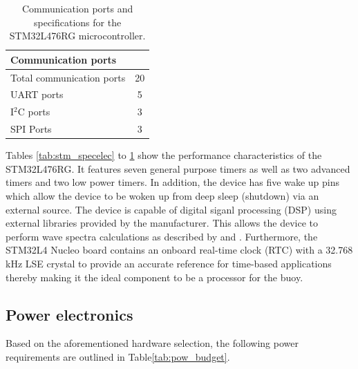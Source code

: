 \begin{table}[H]
	\centering
	\caption{Communication ports and specifications for the STM32L476RG microcontroller. }
	\setlength{\extrarowheight}{5pt}
	\begin{tabular}{l  c}
		\hline
		\multicolumn{2}{l}{\textbf{Communication ports}} \\
		\hline
		\hline
		Total communication ports & 20 \\
		\hline
		UART ports & 5 \\
		\hline
		I$^2$C ports & 3 \\
		\hline
		SPI Ports & 3 \\
		\hline
		\hline
	\end{tabular}
	
	\label{tab:stm_speccom}
\end{table}

Tables \ref{tab:stm_specelec} to \ref{tab:stm_speccom} show the performance characteristics of the STM32L476RG. It features seven general purpose timers as well as two advanced timers and two low power timers. In addition, the device has five wake up pins which allow the device to be woken up from deep sleep (shutdown) via an external source. The device is capable of  digital siganl processing (DSP) using external libraries provided by the manufacturer. This allows the device to perform wave spectra calculations as described by \textcite{kuik1988method} and \textcite{earle1996nondirectional}. Furthermore, the STM32L4 Nucleo board contains an onboard real-time clock (RTC) with a 32.768 kHz LSE crystal to provide an accurate reference for time-based applications thereby making it the ideal component to be a processor for the buoy.

\subsection{Power electronics}

Based on the aforementioned hardware selection, the following power requirements are outlined in Table\ref{tab:pow_budget}.


